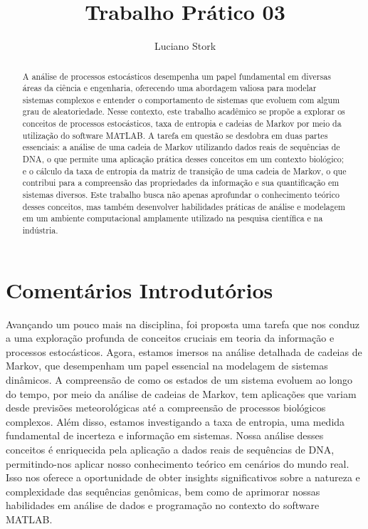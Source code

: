 \documentclass{article}
\title{Trabalho Prático 03}
\author{Luciano Stork}
\begin{document}
\maketitle

\begin{abstract}
A análise de processos estocásticos desempenha um papel fundamental em diversas áreas da ciência e engenharia, oferecendo uma abordagem valiosa para modelar sistemas complexos e entender o comportamento de sistemas que evoluem com algum grau de aleatoriedade. Nesse contexto, este trabalho acadêmico se propõe a explorar os conceitos de processos estocásticos, taxa de entropia e cadeias de Markov por meio da utilização do software MATLAB. A tarefa em questão se desdobra em duas partes essenciais: a análise de uma cadeia de Markov utilizando dados reais de sequências de DNA, o que permite uma aplicação prática desses conceitos em um contexto biológico; e o cálculo da taxa de entropia da matriz de transição de uma cadeia de Markov, o que contribui para a compreensão das propriedades da informação e sua quantificação em sistemas diversos. Este trabalho busca não apenas aprofundar o conhecimento teórico desses conceitos, mas também desenvolver habilidades práticas de análise e modelagem em um ambiente computacional amplamente utilizado na pesquisa científica e na indústria.

\end{abstract}

\section{Comentários Introdutórios}

Avançando um pouco mais na disciplina, foi proposta uma tarefa que nos conduz a uma exploração profunda de conceitos cruciais em teoria da informação e processos estocásticos. Agora, estamos imersos na análise detalhada de cadeias de Markov, que desempenham um papel essencial na modelagem de sistemas dinâmicos. A compreensão de como os estados de um sistema evoluem ao longo do tempo, por meio da análise de cadeias de Markov, tem aplicações que variam desde previsões meteorológicas até a compreensão de processos biológicos complexos. Além disso, estamos investigando a taxa de entropia, uma medida fundamental de incerteza e informação em sistemas. Nossa análise desses conceitos é enriquecida pela aplicação a dados reais de sequências de DNA, permitindo-nos aplicar nosso conhecimento teórico em cenários do mundo real. Isso nos oferece a oportunidade de obter insights significativos sobre a natureza e complexidade das sequências genômicas, bem como de aprimorar nossas habilidades em análise de dados e programação no contexto do software MATLAB.
\end{document}
